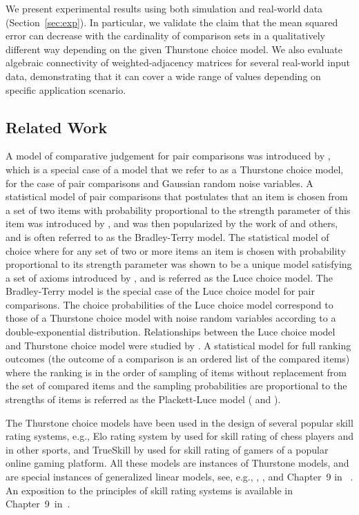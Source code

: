 We present experimental results using both simulation and real-world data (Section~\ref{sec:exp}). In particular, we validate the claim that the mean squared error can decrease with the cardinality of comparison sets in a qualitatively different way depending on the given Thurstone choice model. We also evaluate algebraic connectivity of weighted-adjacency matrices for several real-world input data, demonstrating that it can cover a wide range of values depending on specific application scenario.

\subsection{Related Work}
\label{sec:related}

A model of comparative judgement for pair comparisons was introduced by \cite{T27}, which is a special case of a model that we refer to as a Thurstone choice model, for the case of pair comparisons and Gaussian random noise variables. A statistical model of pair comparisons that postulates that an item is chosen from a set of two items with probability proportional to the strength parameter of this item was introduced by \cite{Z29}, and was then popularized by the work of \cite{BT52,BT54} and others, and is often referred to as the Bradley-Terry model. The statistical model of choice where for any set of two or more items an item is chosen with probability proportional to its strength parameter was shown to be a unique model satisfying a set of axioms introduced by \cite{L59}, and is referred as the Luce choice model. The Bradley-Terry model is the special case of the Luce choice model for pair comparisons. The choice probabilities of the Luce choice model correspond to those of a Thurstone choice model with noise random variables according to a double-exponential distribution. Relationships between the Luce choice model and Thurstone choice model were studied by \cite{Y77}. A statistical model for full ranking outcomes (the outcome of a comparison is an ordered list of the compared items) where the ranking is in the order of sampling of items without replacement from the set of compared items and the sampling probabilities are proportional to the strengths of items is referred as the Plackett-Luce model (\cite{L59} and \cite{P75}).  

The Thurstone choice models have been used in the design of several popular skill rating systems, e.g., Elo rating system by \cite{E78} used for skill rating of chess players and in other sports, and TrueSkill by \cite{GMH07} used for skill rating of gamers of a popular online gaming platform. All these models are instances of Thurstone models, and are special instances of generalized linear models, see, e.g., \cite{NW72}, \cite{MN89}, and Chapter~9 in ~\cite{M12}. An exposition to the principles of skill rating systems is available in Chapter~9~in~\cite{V16}. 

